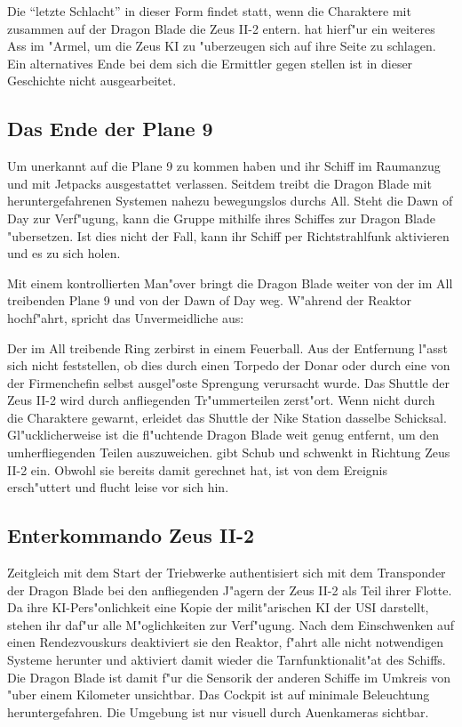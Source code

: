 
Die "`letzte Schlacht"' in dieser Form findet statt, wenn die Charaktere mit \xl{} zusammen auf der Dragon Blade die Zeus II-2 entern. \xl{} hat hierf"ur ein weiteres Ass im "Armel, um die Zeus KI zu "uberzeugen sich auf ihre Seite zu schlagen. Ein alternatives Ende bei dem sich die Ermittler gegen \xl{} stellen ist in dieser Geschichte nicht ausgearbeitet.

\subsection{Das Ende der Plane 9}
Um unerkannt auf die Plane 9 zu kommen haben \xl{} und \ml{} ihr Schiff im Raumanzug und mit Jetpacks ausgestattet verlassen. Seitdem treibt die Dragon Blade mit heruntergefahrenen Systemen nahezu bewegungslos durchs All. Steht die Dawn of Day zur Verf"ugung, kann die Gruppe mithilfe ihres Schiffes zur Dragon Blade "ubersetzen. Ist dies nicht der Fall, kann \xl{} ihr Schiff per Richtstrahlfunk aktivieren und es zu sich holen.

Mit einem kontrollierten Man"over bringt \xl{} die Dragon Blade weiter von der im All treibenden Plane 9 und von der Dawn of Day weg. W"ahrend der Reaktor hochf"ahrt, spricht \xl{} das Unvermeidliche aus:


Der im All treibende Ring zerbirst in einem Feuerball. Aus der Entfernung l"asst sich nicht feststellen, ob dies durch einen Torpedo der Donar oder durch eine von der Firmenchefin selbst ausgel"oste Sprengung verursacht wurde. Das Shuttle der Zeus II-2 wird durch anfliegenden Tr"ummerteilen zerst"ort. Wenn nicht durch die Charaktere gewarnt, erleidet das Shuttle der Nike Station dasselbe Schicksal. Gl"ucklicherweise ist die fl"uchtende Dragon Blade weit genug entfernt, um den umherfliegenden Teilen auszuweichen. \xl{} gibt Schub und schwenkt in Richtung Zeus II-2 ein. Obwohl sie bereits damit gerechnet hat, ist \ml{} von dem Ereignis ersch"uttert und flucht leise vor sich hin.

\subsection{Enterkommando Zeus II-2}
Zeitgleich mit dem Start der Triebwerke authentisiert sich \xl{} mit dem Transponder der Dragon Blade bei den anfliegenden J"agern der Zeus II-2 als Teil ihrer Flotte. Da ihre KI-Pers"onlichkeit eine Kopie der milit"arischen KI der USI darstellt, stehen ihr daf"ur alle M"oglichkeiten zur Verf"ugung. Nach dem Einschwenken auf einen Rendezvouskurs deaktiviert sie den Reaktor, f"ahrt alle nicht notwendigen Systeme herunter und aktiviert damit wieder die Tarnfunktionalit"at des Schiffs. Die Dragon Blade ist damit f"ur die Sensorik der anderen Schiffe im Umkreis von "uber einem Kilometer unsichtbar. Das Cockpit ist auf minimale Beleuchtung heruntergefahren. Die Umgebung ist nur visuell durch Au\3enkameras sichtbar.

